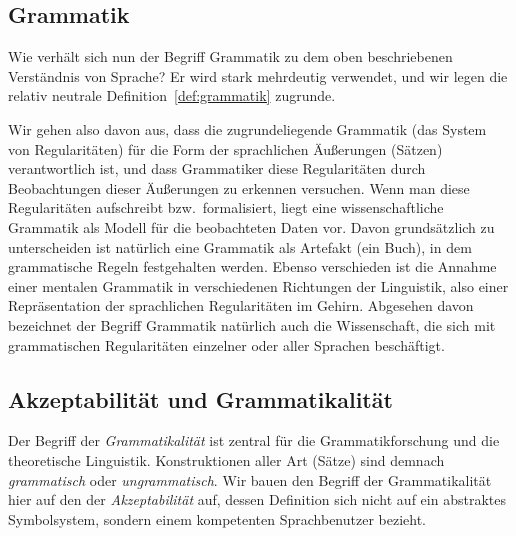\subsection{Grammatik}

Wie verhält sich nun der Begriff Grammatik zu dem oben beschriebenen Verständnis von Sprache?
Er wird stark mehrdeutig verwendet, und wir legen die relativ neutrale Definition~\ref{def:grammatik} zugrunde.


Wir gehen also davon aus, dass die zugrundeliegende Grammatik (das System von Regularitäten) für die Form der sprachlichen Äußerungen (\zB Sätzen) verantwortlich ist, und dass Grammatiker diese Regularitäten durch Beobachtungen dieser Äußerungen zu erkennen versuchen.
Wenn man diese Regularitäten aufschreibt bzw.\ formalisiert, liegt eine wissenschaftliche Grammatik als Modell für die beobachteten Daten vor.
Davon grundsätzlich zu unterscheiden ist natürlich eine Grammatik als Artefakt (\zB ein Buch), in dem grammatische Regeln festgehalten werden.
Ebenso verschieden ist die Annahme einer mentalen Grammatik in verschiedenen Richtungen der Linguistik, also einer Repräsentation der sprachlichen Regularitäten im Gehirn.
Abgesehen davon bezeichnet der Begriff Grammatik natürlich auch die Wissenschaft, die sich mit grammatischen Regularitäten einzelner oder aller Sprachen beschäftigt.

\subsection{Akzeptabilität und Grammatikalität}

\label{sec:grammungramm}
\label{sec:grammatikalitaet}


Der Begriff der \textit{Grammatikalität} ist zentral für die Grammatikforschung und die theoretische Linguistik.
Konstruktionen aller Art (\zB Sätze) sind demnach \textit{grammatisch} oder \textit{ungrammatisch}.
Wir bauen den Begriff der Grammatikalität hier auf den der \textit{Akzeptabilität} auf, dessen Definition sich nicht auf ein abstraktes Symbolsystem, sondern einem kompetenten Sprachbenutzer bezieht.


